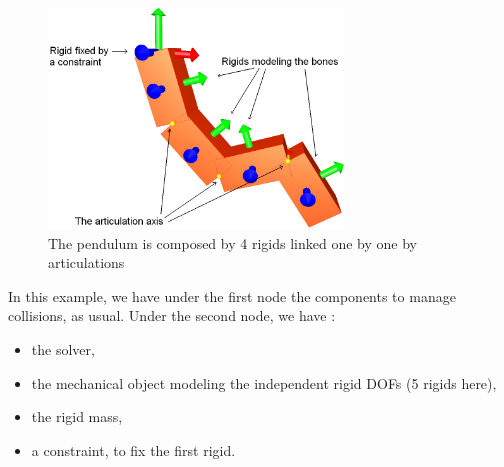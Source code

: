 \begin{figure}[htpb]
	\centering
		\includegraphics[width=0.70\textwidth]{softArt_snapshot.png}
	\caption{The pendulum is composed by 4 rigids linked one by one by articulations}
\end{figure}

In this example, we have under the first node the components to manage collisions, as usual.
Under the second node, we have :
\begin{itemize}
	\item the solver,
	\item the mechanical object modeling the independent rigid DOFs (5 rigids here),
	\item the rigid mass,
	\item a constraint, to fix the first rigid.
\end{itemize}

